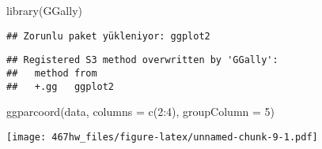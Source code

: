\documentclass[
]{article}
\newenvironment{Shaded}{\begin{snugshade}}{\end{snugshade}}
\newcommand{\AttributeTok}[1]{\textcolor[rgb]{0.77,0.63,0.00}{#1}}
\newcommand{\DecValTok}[1]{\textcolor[rgb]{0.00,0.00,0.81}{#1}}
\newcommand{\FunctionTok}[1]{\textcolor[rgb]{0.00,0.00,0.00}{#1}}
\newcommand{\NormalTok}[1]{#1}
\newcommand{\SpecialCharTok}[1]{\textcolor[rgb]{0.00,0.00,0.00}{#1}}
\begin{document}
\begin{Shaded}
\begin{Highlighting}[]
\FunctionTok{library}\NormalTok{(GGally)}
\end{Highlighting}
\end{Shaded}

\begin{verbatim}
## Zorunlu paket yükleniyor: ggplot2
\end{verbatim}

\begin{verbatim}
## Registered S3 method overwritten by 'GGally':
##   method from   
##   +.gg   ggplot2
\end{verbatim}

\begin{Shaded}
\begin{Highlighting}[]
\FunctionTok{ggparcoord}\NormalTok{(data, }\AttributeTok{columns =} \FunctionTok{c}\NormalTok{(}\DecValTok{2}\SpecialCharTok{:}\DecValTok{4}\NormalTok{), }\AttributeTok{groupColumn =} \DecValTok{5}\NormalTok{)}
\end{Highlighting}
\end{Shaded}

\texttt{[image: 467hw\_files/figure-latex/unnamed-chunk-9-1.pdf]}
\end{document}
